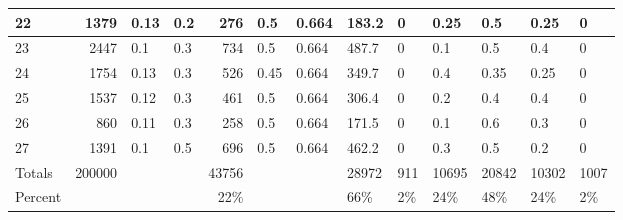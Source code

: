 \documentclass[12pt]{article}
\begin{document}
\begin{sidewaystable}
\begin{tabular}{ | l | r | l | l | r | l | l | l | l |l | l | l | l | }
22&1379&0.13&0.2&276&0.5&0.664&183.2&0&0.25&0.5&0.25&0 \\ \hline
23&2447&0.1&0.3&734&0.5&0.664&487.7&0&0.1&0.5&0.4&0 \\ \hline
24&1754&0.13&0.3&526&0.45&0.664&349.7&0&0.4&0.35&0.25&0 \\ \hline
25&1537&0.12&0.3&461&0.5&0.664&306.4&0&0.2&0.4&0.4&0 \\ \hline
26&860&0.11&0.3&258&0.5&0.664&171.5&0&0.1&0.6&0.3&0 \\ \hline
27&1391&0.1&0.5&696&0.5&0.664&462.2&0&0.3&0.5&0.2&0 \\ \hline
Totals&200000&&&43756&&&28972&911&10695&20842&10302&1007 \\ \hline
Percent&&&&22\%&&&66\%&2\%&24\%&48\%&24\%&2\% \\ \hline
\end{tabular}
\end{sidewaystable}
\end{document}
